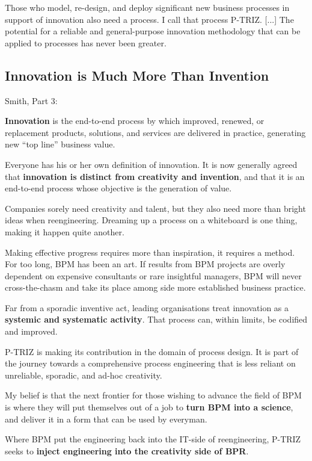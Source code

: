 \documentclass[11pt,a4paper]{article}
\begin{document}
Those who model, re-design, and deploy significant new business processes in
support of innovation also need a process. I call that process P-TRIZ.  [...]
The potential for a reliable and general-purpose innovation methodology that
can be applied to processes has never been greater.

\subsection{Innovation is Much More Than Invention}

Smith, Part 3:

\textbf{Innovation} is the end-to-end process by which improved, renewed, or
replacement products, solutions, and services are delivered in practice,
generating new “top line” business value.

Everyone has his or her own definition of innovation. It is now generally
agreed that \textbf{innovation is distinct from creativity and invention}, and
that it is an end-to-end process whose objective is the generation of value.

Companies sorely need creativity and talent, but they also need more than
bright ideas when reengineering. Dreaming up a process on a whiteboard is one
thing, making it happen quite another.

Making effective progress requires more than inspiration, it requires a
method. For too long, BPM has been an art. If results from BPM projects are
overly dependent on expensive consultants or rare insightful managers, BPM
will never cross-the-chasm and take its place among side more established
business practice.

Far from a sporadic inventive act, leading organisations treat innovation as a
\textbf{systemic and systematic activity}. That process can, within limits, be
codified and improved.

P-TRIZ is making its contribution in the domain of process design. It is part
of the journey towards a comprehensive process engineering that is less
reliant on unreliable, sporadic, and ad-hoc creativity.

My belief is that the next frontier for those wishing to advance the field of
BPM is where they will put themselves out of a job to \textbf{turn BPM into a
  science}, and deliver it in a form that can be used by everyman.

Where BPM put the engineering back into the IT-side of reengineering, P-TRIZ
seeks to \textbf{inject engineering into the creativity side of BPR}.
\end{document}
